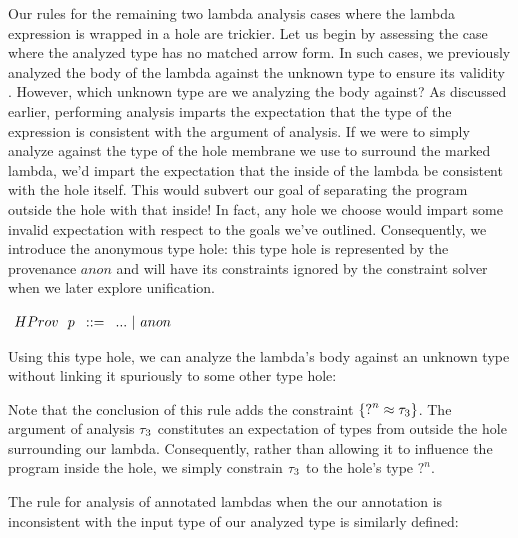 Our rules for the remaining two lambda analysis cases where the lambda expression is wrapped in a hole are trickier. Let us begin by assessing the case where the analyzed type has no matched arrow form. In such cases, we previously analyzed the body of the lambda against the unknown type to ensure its validity . However, which unknown type are we analyzing the body against? As discussed earlier, performing analysis imparts the expectation that the type of the expression is consistent with the argument of analysis. If we were to simply analyze against the type of the hole membrane we use to surround the marked lambda, we'd impart the expectation that the inside of the lambda be consistent with the hole itself. This would subvert our goal of separating the program outside the hole with that inside! In fact, any hole we choose would impart some invalid expectation with respect to the goals we've outlined. Consequently, we introduce the anonymous type hole: this type hole is represented by the provenance $anon$ and will have its constraints ignored by the constraint solver when we later explore unification.

\begin{center}
    $\arraycolsep=4pt\begin{array}{lll}
    HProv~~ p & ::= & 
        ... ~\vert~ 
        anon
        \\
    \end{array}$
\end{center}

Using this type hole, we can analyze the lambda's body against an unknown type without linking it spuriously to some other type hole:

\begin{mathpar}
\end{mathpar}

Note that the conclusion of this rule adds the constraint $\{ \TUnknown^{n} \approx \TMV_3 \}$. The argument of analysis $\TMV_3$ constitutes an expectation of types from outside the hole surrounding our lambda. Consequently, rather than allowing it to influence the program inside the hole, we simply constrain $\TMV_3$ to the hole's type $?^n$.

The rule for analysis of annotated lambdas when the our annotation is inconsistent with the input type of our analyzed type is similarly defined:

